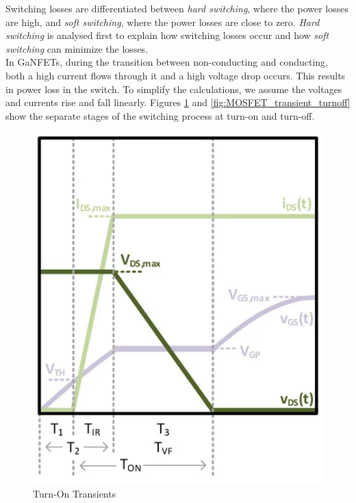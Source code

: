 Switching losses are differentiated between \textit{hard switching}, where the power losses are high, and \textit{soft switching}, where the power losses are close to zero. \textit{Hard switching} is analysed first to explain how switching losses occur and how \textit{soft switching} can minimize the losses.\\
In \acp{GaNFET}, during the transition between non-conducting and conducting, both a high current flows through it and a high voltage drop occurs. This results in power loss in the switch. To simplify the calculations, we assume the voltages and currents rise and fall linearly. Figures \ref{fig:MOSFET_transient_turnon} and \ref{fig:MOSFET_transient_turnoff} show the separate stages of the switching process at turn-on and turn-off.
\begin{figure}[H]
    \centering
    \begin{minipage}{0.5\textwidth}
        \centering
        \includegraphics[width=0.7\linewidth]{Bilder/Kapitel2/MOSFET Transient turnon.png}
        \caption{Turn-On Transients}
        \label{fig:MOSFET_transient_turnon}
    \end{minipage}\hfill
    \begin{minipage}{0.5\textwidth}
        \centering

\end{minipage}
\end{figure}
